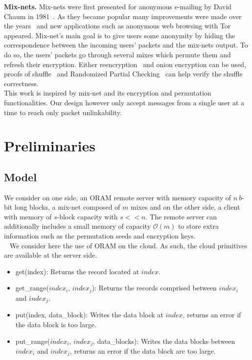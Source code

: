 \documentclass{llncs}
\begin{document}
\noindent\textbf{Mix-nets.}
Mix-nets were first presented for anonymous e-mailing by David Chaum in 1981~\cite{chaum1981untraceable}. As they became popular many improvements were made over the years~\cite{moller2003mixmaster,danezis2003mixminion,danezis2004minx,danezis2009sphinx} and new applications such as anonymous web browsing with Tor~\cite{dingledine2004tor} appeared. Mix-net's main goal is to give users some anonymity by hiding the correspondence between the incoming users' packets and the mix-nets output. To do so, the users' packets go through several mixes which permute them and refresh their encryption. Either reencryption~\cite{wikstrom2006adaptively} and onion encryption can be used, proofs of shuffle~\cite{groth2007verifiable,groth2007non,bayer2012efficient} and Randomized Partial Checking~\cite{jakobsson2002making} can help verify the shuffle correctness.\\
This work is inspired by mix-net and its encryption and permutation functionalities. Our design however only accept messages from a single user at a time to reach only packet unlinkability.
%
\section{Preliminaries}\label{Prelim}
%
\subsection{Model}\label{Model}
We consider on one side, an ORAM remote server with memory capacity of $n\ b$-bit long blocks, a mix-net composed of $m$ mixes and on the other side, a client with memory of $s$-block capacity with $s<<n$. The remote server can additionally includes a small memory of capacity $\mathcal{O}(m)$ to store extra information such as the permutation seeds and encryption keys.\\\
%
We consider here the use of ORAM on the cloud. As such, the cloud primitives are available at the server side. 
\begin{itemize}
 \item get(index): Returns the record located at $index$.
 \item get\_range($index_i$, $index_j$): Returns the records comprised between $index_i$ and $index_j$.
 \item put(index, data\_block):  Writes the data block at $index$, returns an error if the data block is too large.
 \item put\_range($index_i$, $index_j$, data\_blocks): Writes the data blocks between $index_i$ and $index_j$, returns an error if the data block are too large.
\end{itemize}
\end{document}
